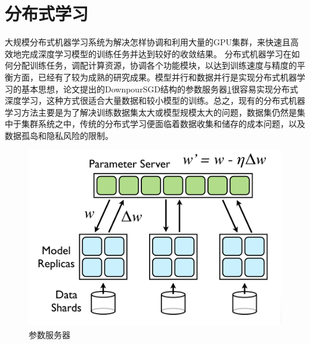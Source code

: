 \documentclass[zihao = -4,cn]{oucart}
\begin{document}
\newpage
\section{分布式学习}
大规模分布式机器学习系统为解决怎样协调和利用大量的GPU集群，来快速且高效地完成深度学习模型的训练任务并达到较好的收敛结果。 分布式机器学习在如何分配训练任务，调配计算资源，协调各个功能模块，以达到训练速度与精度的平衡方面，已经有了较为成熟的研究成果\cite{ho2013more}\cite{xing2015petuum}\cite{wei2015managed}。模型并行和数据并行是实现分布式机器学习的基本思想，论文\cite{dean2012large}提出的DownpourSGD结构的参数服务器\ref{fig:pserver}很容易实现分布式深度学习，这种方式很适合大量数据和较小模型的训练。总之，现有的分布式机器学习方法主要是为了解决训练数据集太大或模型规模太大的问题，数据集仍然是集中于集群系统之中，传统的分布式学习便面临着数据收集和储存的成本问题，以及数据孤岛和隐私风险的限制。

\begin{figure}[h]
	\centering %
	\includegraphics[scale=0.5]{assets/pserver}
	\caption{参数服务器\cite{dean2012large}}
	\label{fig:pserver}
\end{figure}
\end{document}
